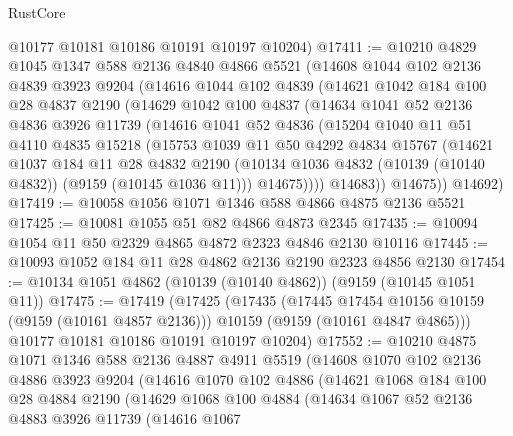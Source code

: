 \begin{lexlean}{RustCore}
\begin{coremodule}
      @10177
      @10181
      @10186
      @10191
      @10197
      @10204)
@17411 := @10210
    @4829
    @1045
    @1347
    @588
    @2136
    @4840
    @4866
    @5521
    (@14608
      @1044
      @102
      @2136
      @4839
      @3923
      @9204
      (@14616
        @1044
        @102
        @4839
        (@14621
          @1042
          @184
          @100
          @28
          @4837
          @2190
          (@14629
            @1042
            @100
            @4837
            (@14634
              @1041
              @52
              @2136
              @4836
              @3926
              @11739
              (@14616
                @1041
                @52
                @4836
                (@15204
                  @1040
                  @11
                  @51
                  @4110
                  @4835
                  @15218
                  (@15753
                    @1039
                    @11
                    @50
                    @4292
                    @4834
                    @15767
                    (@14621
                      @1037
                      @184
                      @11
                      @28
                      @4832
                      @2190
                      (@10134 @1036 @4832 (@10139 (@10140 @4832)) (@9159 (@10145 @1036 @11)))
                      @14675))))
              @14683))
          @14675))
      @14692)
@17419 := @10058 @1056 @1071 @1346 @588 @4866 @4875 @2136 @5521
@17425 := @10081 @1055 @51 @82 @4866 @4873 @2345
@17435 := @10094 @1054 @11 @50 @2329 @4865 @4872 @2323 @4846 @2130 @10116
@17445 := @10093 @1052 @184 @11 @28 @4862 @2136 @2190 @2323 @4856 @2130
@17454 := @10134 @1051 @4862 (@10139 (@10140 @4862)) (@9159 (@10145 @1051 @11))
@17475 := @17419
    (@17425
      (@17435
        (@17445 @17454 @10156 @10159 (@9159 (@10161 @4857 @2136)))
        @10159
        (@9159 (@10161 @4847 @4865)))
      @10177
      @10181
      @10186
      @10191
      @10197
      @10204)
@17552 := @10210
    @4875
    @1071
    @1346
    @588
    @2136
    @4887
    @4911
    @5519
    (@14608
      @1070
      @102
      @2136
      @4886
      @3923
      @9204
      (@14616
        @1070
        @102
        @4886
        (@14621
          @1068
          @184
          @100
          @28
          @4884
          @2190
          (@14629
            @1068
            @100
            @4884
            (@14634
              @1067
              @52
              @2136
              @4883
              @3926
              @11739
              (@14616
                @1067

\end{coremodule}
\end{lexlean}
